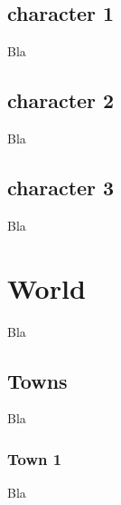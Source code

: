 \documentclass[a4paper,12pt]{book}
\begin{document}
\section{character 1}
Bla
\section{character 2}
Bla
\section{character 3}
Bla
\chapter{World}
Bla
\section{Towns}
Bla
\subsection{Town 1}
Bla
\end{document}

